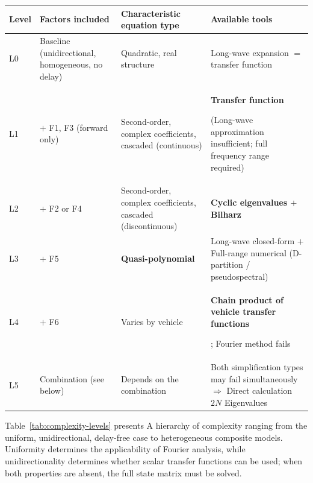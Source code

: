 \documentclass[11pt,a4paper,openany]{book}
\numberwithin{equation}{chapter}
\numberwithin{figure}{chapter}
\numberwithin{table}{chapter}
\newcommand{\tabletext}[2]{%
  \par\smallskip\noindent
  Table~\ref{#1} presents #2
\par\smallskip
}
\begin{document}
\begin{center}
\small
{}
\label{tab:complexity-levels}
\begin{tabular}{p{1.0cm}p{4.0cm}p{3.4cm}p{4.8cm}}
\toprule
\textbf{Level} & \textbf{Factors included} & \textbf{Characteristic equation type} & \textbf{Available tools} \\
\midrule
L0 &

Baseline (unidirectional, homogeneous, no delay)

&

Quadratic, real structure&Long-wave expansion $=$ transfer function
\\[4pt]
L1 &

$+$ F1, F3 (forward only)

&

Second-order, complex coefficients, cascaded (continuous)

& \textbf{Transfer function}

(Long-wave approximation insufficient; full frequency range required)
\\[4pt]
L2 &

$+$ F2 or F4

&

Second-order, complex coefficients, cascaded (discontinuous)

& \textbf{Cyclic eigenvalues $+$ Bilharz} \\[4pt]
L3 & $+$ F5 & \textbf{Quasi-polynomial} &

Long-wave closed-form $+$ Full-range numerical (D-partition / pseudospectral)
\\[4pt]
L4 & $+$ F6 &

Varies by vehicle

& \textbf{Chain product of vehicle transfer functions}

; Fourier method fails
\\[4pt]
L5 &

Combination (see below)

&

Depends on the combination

&

Both simplification types may fail simultaneously $\Rightarrow$ Direct calculation $2N$ Eigenvalues\\
\bottomrule
\end{tabular}
\end{center}
\tabletext{tab:complexity-levels}{A hierarchy of complexity ranging from the uniform, unidirectional, delay-free case to heterogeneous composite models. Uniformity determines the applicability of Fourier analysis, while unidirectionality determines whether scalar transfer functions can be used; when both properties are absent, the full state matrix must be solved.
}
\end{document}
